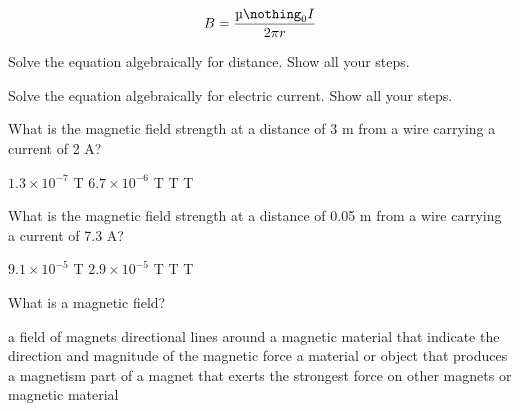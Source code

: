 \documentclass[]{exam}
\begin{document}
\begin{questions}
\begin{equation*}
    B = \frac{\mymu_0 I}{2\pi r}
\end{equation*}

\question \label{LhsqrR}
Solve the equation algebraically for distance. Show all your steps.

\question \label{JxMpCM}
Solve the equation algebraically for electric current. Show all your steps.


\question
What is the magnetic field strength at a distance of 3 m from a wire carrying a current of 2 A?

\begin{randomizechoices}
\CorrectChoice $1.3 \times 10^{-7}$ T
\choice $6.7 \times 10^{-6}$ T
 T
 T
\end{randomizechoices}

\question
What is the magnetic field strength at a distance of 0.05 m from a wire carrying a current of 7.3 A?

\begin{randomizechoices}
\choice $9.1 \times 10^{-5}$ T
\CorrectChoice $2.9 \times 10^{-5}$ T
 T
 T
\end{randomizechoices}


\question
What is a magnetic field?

\begin{randomizechoices}
\choice a field of magnets
\CorrectChoice directional lines around a magnetic material that indicate the direction and magnitude of the magnetic force
\choice a material or object that produces a magnetism
\choice part of a magnet that exerts the strongest force on other magnets or magnetic material
\end{randomizechoices}
\end{questions}
\end{document}
